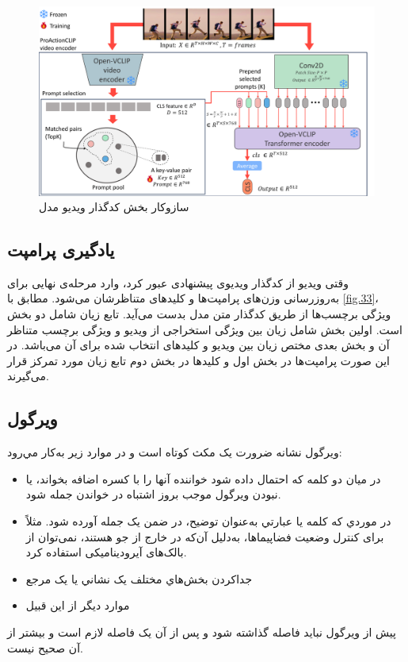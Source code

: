 \begin{figure}
	\centering\includegraphics[scale=.58]{Images/Chapter3/video_encoder.png}
	\caption[]{سازوکار بخش کدگذار ویدیو مدل }
	\label{fig.34}
\end{figure}
\subsection{یادگیری پرامپت}
وقتی ویدیو از کدگذار ویدیوی پیشنهادی عبور کرد، وارد مرحله‌ی نهایی برای به‌روزرسانی وزن‌های پرامپت‌ها و کلید‌های متناظرشان می‌شود. مطابق با \cref{fig.33}، ویژگی برچسب‌ها از طریق کدگذار متن مدل  بدست می‌آید. تابع زیان شامل دو بخش است. اولین بخش شامل زیان بین ویژگی استخراجی از ویدیو و ویژگی برچسب متناظر آن و بخش بعدی مختص زیان بین ویدیو و کلیدهای انتخاب شده برای آن می‌باشد. در این صورت پرامپت‌ها در بخش اول و کلیدها در بخش دوم تابع زیان مورد تمرکز قرار می‌گیرند. 

\subsection{ويرگول}
ويرگول نشانه ضرورت یک مکث کوتاه است و در موارد زير به‌کار مي‌رود:
\begin{itemize}
\item
در ميان دو کلمه که احتمال داده شود خواننده آنها را با کسره اضافه بخواند، يا نبودن ويرگول موجب بروز اشتباه در خواندن جمله شود.
\item
در موردي که کلمه يا عبارتي به‌‌‌‌عنوان توضيح، در ضمن یک جمله آورده شود. مثلاً برای کنترل وضعیت فضاپیماها، به‌دلیل آن‌که در خارج از جو هستند، نمی‌توان از بالک‌های آیرودینامیکی استفاده کرد.
\item
جدا‌کردن بخش‌هاي مختلف يک نشاني يا یک مرجع
\item
موارد دیگر از این قبیل
\end{itemize}
پیش از ويرگول نبايد فاصله گذاشته شود و پس از آن يک فاصله لازم است و بيشتر از آن صحیح نیست.
